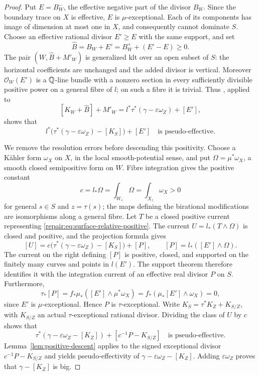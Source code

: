 \begin{proof}
Put $E=B_W^-$, the effective negative part of the divisor $B_W$.
Since the boundary trace on $X$ is effective, $E$ is
$\mu$-exceptional. Each of its components has image of dimension at
most one in $X$, and consequently cannot dominate $S$. Choose an
effective rational divisor $E'\geq E$ with the same support, and set
\[
                  \widehat B=B_W+E'
                       =B_W^++(E'-E)\geq0.
\]
The pair $(W,\widehat B+M'_W)$ is generalized klt over an open
subset of $S$: the horizontal coefficients are unchanged and the
added divisor is vertical. Moreover $\mathcal O_W(E')$ is a
$\mathbb Q$-line bundle with a nonzero section in every sufficiently
divisible positive power on a general fibre of $l$; on such a
fibre it is trivial. Thus \cite[Theorem~2.2]{HP2024}, applied to
\[
 [K_W+\widehat B]+M'_W
       =l^*\tau^*(\gamma-\varepsilon\omega_Z)+[E'],
\]
shows that
\begin{equation}\label{repair:eq:surface-relative-positive}
 l^*\bigl(\tau^*(\gamma-\varepsilon\omega_Z)-[K_S]\bigr)+[E']
                     \quad\text{is pseudo-effective}.
\end{equation}

We remove the resolution errors before descending this positivity.
Choose a K\"ahler form $\omega_X$ on $X$, in the local smooth-potential
sense, and put
$\Omega=\mu^*\omega_X$, a smooth closed semipositive form on $W$.
Fibre integration gives the positive constant
\[
 c=l_*\Omega=\int_{W_s}\Omega
               =\int_{X_z}\omega_X>0
\]
for general $s\in S$ and $z=\tau(s)$; the maps defining the
birational modifications are isomorphisms along a general fibre.
Let $T$ be a closed positive current representing
\eqref{repair:eq:surface-relative-positive}. The current
$U=l_*(T\wedge\Omega)$ is closed and positive, and the projection
formula gives
\[
 [U]=c\bigl(\tau^*(\gamma-\varepsilon\omega_Z)-[K_S]\bigr)+[P],
                \qquad [P]=l_*([E']\wedge\Omega).
\]
The current on the right defining $[P]$ is positive, closed, and
supported on the finitely many curves and points in $l(E')$.
The support theorem therefore identifies it with the integration
current of an effective real divisor $P$ on $S$. Furthermore,
\[
 \tau_*[P]
   =f_*\mu_*([E']\wedge\mu^*\omega_X)
   =f_*(\mu_*[E']\wedge\omega_X)=0,
\]
since $E'$ is $\mu$-exceptional. Hence $P$ is $\tau$-exceptional.
Write $K_S=\tau^*K_Z+K_{S/Z}$, with $K_{S/Z}$ an actual
$\tau$-exceptional rational divisor. Dividing the class of $U$ by
$c$ shows that
\[
 \tau^*(\gamma-\varepsilon\omega_Z-[K_Z])
                    +[c^{-1}P-K_{S/Z}]
                         \quad\text{is pseudo-effective}.
\]
Lemma~\ref{lem:positive-descent} applies to the signed exceptional
divisor $c^{-1}P-K_{S/Z}$ and yields pseudo-effectivity of
$\gamma-\varepsilon\omega_Z-[K_Z]$. Adding
$\varepsilon\omega_Z$ proves that $\gamma-[K_Z]$ is big.
\end{proof}


